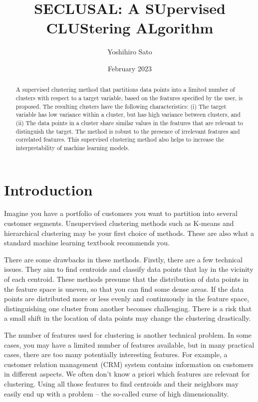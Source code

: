 \documentclass{article}
\title{SECLUSAL: A SUpervised CLUStering ALgorithm}
\author{Yoshihiro Sato}
\date{February 2023}
\begin{document}
\begin{abstract}
A supervised clustering method that partitions data points into a limited number of clusters with respect to a target variable, based on the features specified by the user, is proposed.
The resulting clusters have the following characteristics: 
(i) The target variable has low variance within a cluster, but has high variance between clusters, and (ii) The data points in a cluster share similar values in the features that are relevant to distinguish the target. 
The method is robust to %
the presence of irrelevant features and correlated features. 
This supervised clustering method also helps to increase the interpretability of machine learning models.
\end{abstract}

\maketitle

\section{Introduction}

Imagine you have a portfolio of customers you want to partition into several customer segments. Unsupervised clustering methods such as K-means and hierarchical clustering may be your first choice of methods. These are also what a standard machine learning textbook recommends you. 

There are some drawbacks in these methods. Firstly, there are a few technical issues. They aim to find centroids and classify data points that lay in the vicinity of each centroid. These methods presume that the distribution of data points in the feature space is uneven, so that you can find some dense areas. If the data points are distributed more or less evenly and continuously in the feature space, distinguishing one cluster from another becomes challenging. There is a risk that a small shift in the location of data points may change the clustering drastically.

The number of features used for clustering is another technical problem. In some cases, you may have a limited number of features available, but in many practical cases, there are too many potentially interesting features. For example, a customer relation management (CRM) system contains information on customers in different aspects. We often don’t know a priori which features are relevant for clustering. Using all those features to find centroids and their neighbors may easily end up with a problem -- the so-called curse of high dimensionality. 
\end{document}

